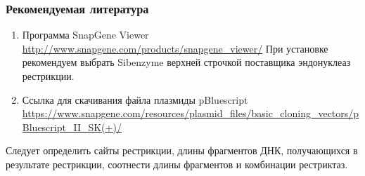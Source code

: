 \subsubsection*{Рекомендуемая литература}

\begin{enumerate}
    \item Программа SnapGene Viewer \url{http://www.snapgene.com/products/snapgene_viewer/} При установке рекомендуем выбрать Sibenzyme верхней строчкой поставщика эндонуклеаз рестрикции. 
    \item Ссылка для скачивания файла плазмиды pBluescript\\ \url{https://www.snapgene.com/resources/plasmid_files/basic_cloning_vectors/pBluescript_II_SK(+)/}
\end{enumerate}

\explanationSection

Следует определить сайты рестрикции, длины фрагментов ДНК, получающихся в результате рестрикции, соотнести длины фрагментов и комбинации рестриктаз.


